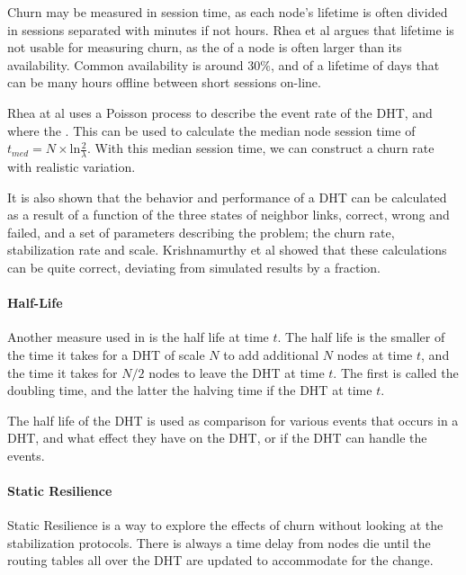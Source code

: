 Churn may be measured in session time, as each node's lifetime is often divided in sessions
 separated with minutes if not hours. Rhea et al argues that lifetime is not usable for
 measuring churn, as the  of a node is often larger than its
 availability. Common availability is around $30\%$\cite{rhea-04-handling-churn}, and of
 a lifetime of days that can be many hours offline\cite{liben-nowell-02-observations}
 between short sessions on-line.

Rhea at al uses a Poisson process to describe the event
 rate of the DHT, and where the \cite{rhea-04-handling-churn}.
 This can be used to calculate
 the median node session time of $ t_{med} = N\times\mathrm{ln}\frac{2}{\lambda} $.
 With this median session time, we can construct a churn rate with realistic variation.

It is also shown that the behavior and performance of a DHT can be calculated as a
 result of a function of the three states of neighbor links, correct, wrong and failed,
 and a set of parameters describing the problem; the churn rate, stabilization rate and
 scale\cite{krishnamurthy-05-statistical}. Krishnamurthy et al showed that these
 calculations can be quite correct, deviating from simulated results by a fraction.

\paragraph{Half-Life}
Another measure used in \cite{liben-nowell-02-observations} is the half life at time $t$.
 The half life is the smaller of the time it takes for a DHT of scale $N$ to add
 additional $N$ nodes at time $t$, and the time it takes for $N/2$ nodes to leave the DHT
 at time $t$. The first is called the doubling time, and the latter the halving time if
 the DHT at time $t$.

The half life of the DHT is used as comparison for various events that occurs in a DHT,
 and what effect they have on the DHT, or if the DHT can handle the events.

\paragraph{Static Resilience}
Static Resilience is a way to explore the effects of churn without looking at the
 stabilization protocols\cite{gummadi-03-impact-geometry}. There is always a time delay
 from nodes die until the routing tables all over the DHT are updated to accommodate
 for the change.

